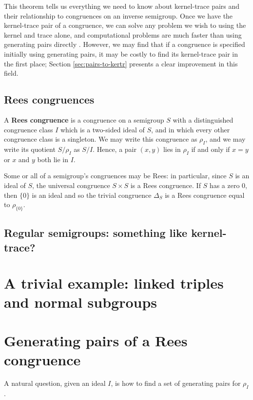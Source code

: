 This theorem tells us everything we need to know about kernel-trace pairs and
their relationship to congruences on an inverse semigroup.  Once we have the
kernel-trace pair of a congruence, we can solve any problem we wish to using the
kernel and trace alone, and computational problems are much faster than using
generating pairs directly \cite[\S 6.1.3]{mtorpey_msc}.  However, we may find
that if a congruence is specified initially using generating pairs, it may be
costly to find its kernel-trace pair in the first place; Section
\ref{sec:pairs-to-kertr} presents a clear improvement in this field.

\subsection{Rees congruences}
A \textbf{Rees congruence} is a congruence on a semigroup $S$ with a
distinguished congruence class $I$ which is a two-sided ideal of $S$, and in
which every other congruence class is a singleton.  We may write this congruence
as $\rho_I$, and we may write its quotient $S/\rho_I$ as $S/I$.  Hence, a pair
$(x,y)$ lies in $\rho_I$ if and only if $x=y$ or $x$ and $y$ both lie in $I$.

Some or all of a semigroup's congruences may be Rees: in particular, since $S$
is an ideal of $S$, the universal congruence $S \times S$ is a Rees congruence.
If $S$ has a zero $0$, then $\{0\}$ is an ideal and so the trivial congruence
$\Delta_S$ is a Rees congruence equal to $\rho_{\{0\}}$.

\subsection{Regular semigroups: something like kernel-trace?}

\section{A trivial example: linked triples and normal subgroups}

\section{Generating pairs of a Rees congruence}
\label{sec:rees-to-pairs}
A natural question, given an ideal $I$, is how to find a set of generating pairs
for $\rho_I$.

